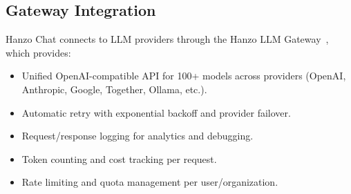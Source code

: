 \subsection{Gateway Integration}

Hanzo Chat connects to LLM providers through the Hanzo LLM Gateway~\cite{hanzollm2025}, which provides:

\begin{itemize}[leftmargin=1.1em]
    \item Unified OpenAI-compatible API for 100+ models across providers (OpenAI, Anthropic, Google, Together, Ollama, etc.).
    \item Automatic retry with exponential backoff and provider failover.
    \item Request/response logging for analytics and debugging.
    \item Token counting and cost tracking per request.
    \item Rate limiting and quota management per user/organization.
\end{itemize}

